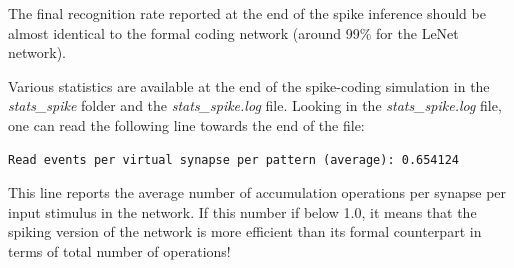 \documentclass[a4paper,11pt,oneside]{article}
\begin{document}
The final recognition rate reported at the end of the spike inference should be
almost identical to the formal coding network (around 99\% for the LeNet
network).

Various statistics are available at the end of the spike-coding simulation in
the \emph{stats\_spike} folder and the \emph{stats\_spike.log} file. Looking in
the \emph{stats\_spike.log} file, one can read the following line towards the
end of the file:

\begin{lstlisting}
Read events per virtual synapse per pattern (average): 0.654124
\end{lstlisting}

This line reports the average number of accumulation operations per synapse
per input stimulus in the network. If this number if below 1.0, it means that
the spiking version of the network is more efficient than its formal counterpart
in terms of total number of operations!


\clearpage

%
%
%
%
%
%
%





\fi
\end{document}
